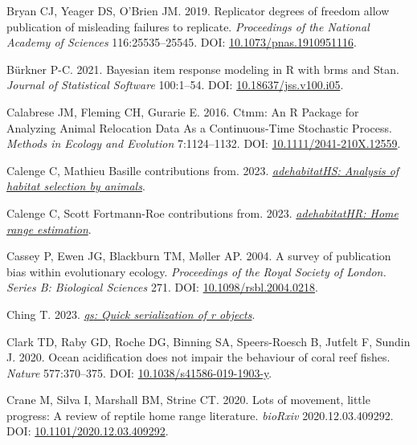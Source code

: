 \documentclass[10pt,a4paper]{article}
\newlength{\cslhangindent}
\newlength{\cslentryspacingunit} %
\newenvironment{CSLReferences}[2] %
 {%
  \setlength{\parindent}{0pt}
  \ifodd #1
  \let\oldpar\par
  \def\par{\hangindent=\cslhangindent\oldpar}
  \fi
  \setlength{\parskip}{#2\cslentryspacingunit}
 }%
 {}
\begin{document}
\begin{CSLReferences}{1}{0}
\leavevmode{}%
Bryan CJ, Yeager DS, O'Brien JM. 2019. Replicator degrees of freedom allow publication of misleading failures to replicate. \emph{Proceedings of the National Academy of Sciences} 116:25535--25545. DOI: \href{https://doi.org/10.1073/pnas.1910951116}{10.1073/pnas.1910951116}.

\leavevmode{}%
Bürkner P-C. 2021. Bayesian item response modeling in {R} with {brms} and {Stan}. \emph{Journal of Statistical Software} 100:1--54. DOI: \href{https://doi.org/10.18637/jss.v100.i05}{10.18637/jss.v100.i05}.

\leavevmode{}%
Calabrese JM, Fleming CH, Gurarie E. 2016. Ctmm: An {R} {Package} for {Analyzing} {Animal} {Relocation} {Data} {As} a {Continuous}-{Time} {Stochastic} {Process}. \emph{Methods in Ecology and Evolution} 7:1124--1132. DOI: \href{https://doi.org/10.1111/2041-210X.12559}{10.1111/2041-210X.12559}.

\leavevmode{}%
Calenge C, Mathieu Basille contributions from. 2023. \emph{\href{https://CRAN.R-project.org/package=adehabitatHS}{{adehabitatHS}: Analysis of habitat selection by animals}}.

\leavevmode{}%
Calenge C, Scott Fortmann-Roe contributions from. 2023. \emph{\href{https://CRAN.R-project.org/package=adehabitatHR}{{adehabitatHR}: Home range estimation}}.

\leavevmode{}%
Cassey P, Ewen JG, Blackburn TM, Møller AP. 2004. A survey of publication bias within evolutionary ecology. \emph{Proceedings of the Royal Society of London. Series B: Biological Sciences} 271. DOI: \href{https://doi.org/10.1098/rsbl.2004.0218}{10.1098/rsbl.2004.0218}.

\leavevmode{}%
Ching T. 2023. \emph{\href{https://CRAN.R-project.org/package=qs}{{qs}: Quick serialization of r objects}}.

\leavevmode{}%
Clark TD, Raby GD, Roche DG, Binning SA, Speers-Roesch B, Jutfelt F, Sundin J. 2020. Ocean acidification does not impair the behaviour of coral reef fishes. \emph{Nature} 577:370--375. DOI: \href{https://doi.org/10.1038/s41586-019-1903-y}{10.1038/s41586-019-1903-y}.

\leavevmode{}%
Crane M, Silva I, Marshall BM, Strine CT. 2020. Lots of movement, little progress: {A} review of reptile home range literature. \emph{bioRxiv} 2020.12.03.409292. DOI: \href{https://doi.org/10.1101/2020.12.03.409292}{10.1101/2020.12.03.409292}.


\end{CSLReferences}
\end{document}
